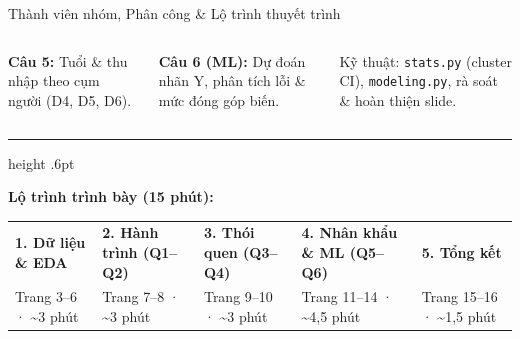 \documentclass[aspectratio=169,12pt]{beamer}
\newcommand{\Point}[1]{#1\par\vspace{2mm}}
\begin{document}
\begin{frame}[t]{Thành viên nhóm, Phân công \& Lộ trình thuyết trình}
\begin{columns}[T,onlytextwidth]
{        \Point{\textbf{Câu 5:} Tuổi \& thu nhập theo cụm người (D4, D5, D6).}
        \Point{\textbf{Câu 6 (ML):} Dự đoán nhãn Y, phân tích lỗi \& mức đóng góp biến.}
        {\color{Muted}\fontsize{12}{16}\selectfont Kỹ thuật: \texttt{stats.py} (cluster CI), \texttt{modeling.py}, rà soát \& hoàn thiện slide.}}
  \end{columns}
  \vspace{11mm}
  {\color{Line}\hrule height .6pt}\vspace{4mm}
  {\fontsize{13.5}{18}\selectfont\bfseries\color{Accent}Lộ trình trình bày (15 phút):\par}\vspace{2.5mm}
  {\fontsize{12.8}{17.5}\selectfont
  \begin{tabular}{@{}p{58mm}p{58mm}p{58mm}p{68mm}p{52mm}@{}}
    \textbf{1. Dữ liệu \& EDA} & \textbf{2. Hành trình (Q1–Q2)} & \textbf{3. Thói quen (Q3–Q4)} & \textbf{4. Nhân khẩu \& ML (Q5–Q6)} & \textbf{5. Tổng kết}\\
    {\color{Muted}Trang 3–6 · \textasciitilde 3 phút} & {\color{Muted}Trang 7–8 · \textasciitilde 3 phút} & {\color{Muted}Trang 9–10 · \textasciitilde 3 phút} & {\color{Muted}Trang 11–14 · \textasciitilde 4,5 phút} & {\color{Muted}Trang 15–16 · \textasciitilde 1,5 phút}
  \end{tabular}}
\end{frame}
\end{document}
